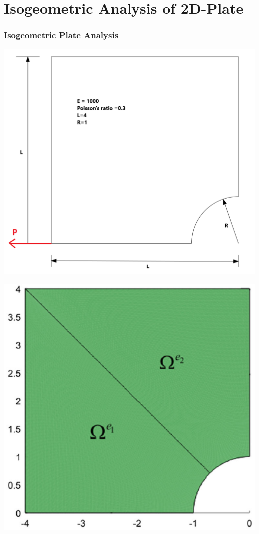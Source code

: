 \documentclass{beamer}
\begin{document}
\section{Isogeometric Analysis of 2D-Plate}
\begin{frame}[allowframebreaks] \frametitle{Isogeometric Plate Analysis}
\begin{minipage}[b]{0.48\linewidth}
    \includegraphics[width=1.0\textwidth,height=0.54\textheight]{figures/plate2.png} \\
    \centering \label{Underformed Plate}
  \end{minipage}
  \begin{minipage}[b]{0.48\linewidth}
    \includegraphics[width=1.0\textwidth,height=0.54\textheight]{figures/plate_elems.PNG} \\

\end{minipage}
\end{frame}
\end{document}
